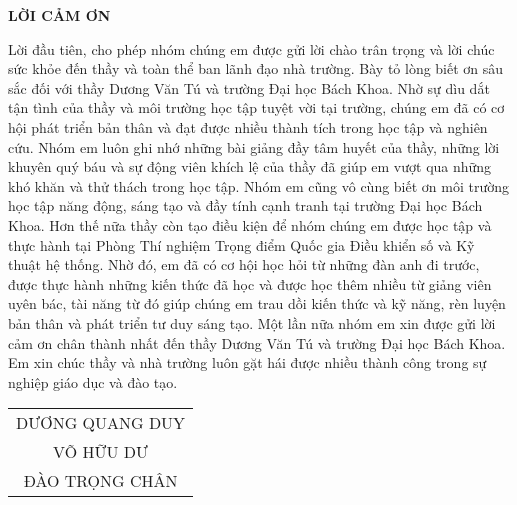 \begin{center}
    \textbf{\Large LỜI CẢM ƠN}
\end{center}
\thispagestyle{empty} %
\hspace{0.6cm}Lời đầu tiên, cho phép nhóm chúng em được gửi lời chào trân trọng và lời chúc sức khỏe đến thầy
và toàn thể ban lãnh đạo nhà trường. Bày tỏ lòng biết ơn sâu sắc đối với thầy Dương Văn Tú 
và trường Đại học Bách Khoa. Nhờ sự dìu dắt tận tình của thầy và
môi trường học tập tuyệt vời tại trường, chúng em đã có cơ hội phát triển bản thân và đạt được
nhiều thành tích trong học tập và nghiên cứu.
Nhóm em luôn ghi nhớ những bài giảng đầy tâm huyết của thầy, những lời khuyên quý báu
và sự động viên khích lệ của thầy đã giúp em vượt qua những khó khăn và thử thách
trong học tập. Nhóm em cũng vô cùng biết ơn môi trường học tập năng động, sáng tạo và đầy
tính cạnh tranh tại trường Đại học Bách Khoa. Hơn thế nữa thầy còn tạo điều kiện để 
nhóm chúng em được học tập và thực hành tại Phòng Thí nghiệm Trọng điểm Quốc gia Điều khiển số và Kỹ thuật hệ thống. 
Nhờ đó, em đã có cơ hội học hỏi từ những đàn anh đi trước, được thực hành những kiến thức đã học và được học thêm nhiều từ
giảng viên uyên bác, tài năng từ đó giúp chúng em trau dồi kiến thức và kỹ năng, rèn luyện bản thân và phát
triển tư duy sáng tạo.
Một lần nữa nhóm em xin được gửi lời cảm ơn chân thành nhất đến thầy Dương Văn Tú và trường
Đại học Bách Khoa. Em xin chúc thầy và nhà trường luôn gặt hái được nhiều thành công
trong sự nghiệp giáo dục và đào tạo.
\begin{table}[H]
    \begin{flushright}
        \begin{tabular}{c}
            DƯƠNG QUANG DUY \\
            VÕ HỮU DƯ \\
            ĐÀO TRỌNG CHÂN \\   
        \end{tabular}
    \end{flushright}
\end{table}
\cleardoublepage